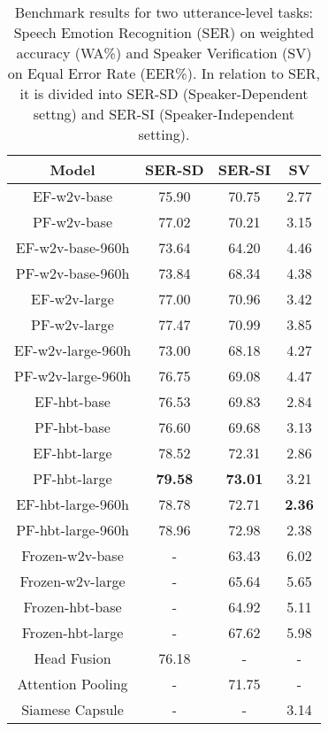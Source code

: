 \documentclass{article}
\begin{document}
\begin{table}[th]
  \centering
  \caption{Benchmark results for two utterance-level tasks: Speech Emotion Recognition (SER) on weighted accuracy (WA\%) and Speaker Verification (SV) on Equal Error Rate (EER\%). In relation to SER, it is divided into SER-SD (Speaker-Dependent settng) and SER-SI (Speaker-Independent setting).
}
  \label{tab:example}
  \centering
  \begin{tabular}{cccc}
    \toprule
    \multicolumn{1}{c}{\textbf{Model}} &   \multicolumn{1}{c}{\textbf{SER-SD}}   &
    \multicolumn{1}{c}{\textbf{SER-SI}}   &
    \multicolumn{1}{c}{\textbf{SV}}\\
    \midrule
    EF-w2v-base          & 75.90 & 70.75 & 2.77 \\
    PF-w2v-base          & 77.02 & 70.21 & 3.15 \\
    EF-w2v-base-960h     & 73.64 & 64.20 & 4.46  \\
    PF-w2v-base-960h     & 73.84 & 68.34 & 4.38  \\
    \midrule
    EF-w2v-large          & 77.00 & 70.96 & 3.42  \\
    PF-w2v-large          & 77.47 & 70.99 & 3.85  \\
    EF-w2v-large-960h     & 73.00 & 68.18 & 4.27  \\
    PF-w2v-large-960h     & 76.75 & 69.08 & 4.47  \\
    \midrule
    EF-hbt-base          & 76.53 & 69.83 & 2.84 \\
    PF-hbt-base          & 76.60 & 69.68 & 3.13 \\
    \midrule
    EF-hbt-large          & 78.52 & 72.31 & 2.86  \\
    PF-hbt-large          & \textbf{79.58} & \textbf{73.01} & 3.21  \\
    EF-hbt-large-960h     & 78.78 & 72.71 & \textbf{2.36} \\
    PF-hbt-large-960h     & 78.96 & 72.98 & 2.38 \\
    \midrule
    Frozen-w2v-base\cite{superb} & - & 63.43 & 6.02 \\
    Frozen-w2v-large\cite{superb} & - & 65.64 & 5.65 \\
    Frozen-hbt-base\cite{superb} & - & 64.92 & 5.11 \\
    Frozen-hbt-large\cite{superb} & - & 67.62 & 5.98 \\
    \midrule
    Head Fusion\cite{head-fusion} & 76.18 & - & -  \\
    Attention Pooling\cite{attention_pooling} & - & 71.75 & -  \\
    Siamese Capsule\cite{siamese} & - & - & 3.14  \\
    \bottomrule
  \end{tabular}
  
\end{table}
\end{document}
